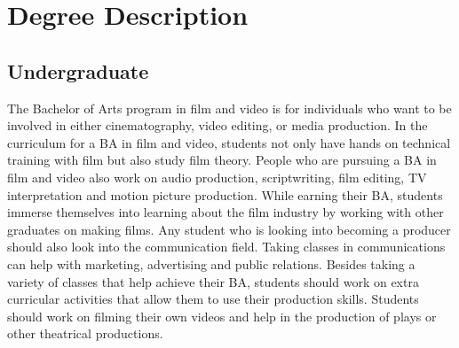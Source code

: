 \begin{itemize}
\end{itemize}

\section{Degree Description}
    \subsection{Undergraduate}
		The Bachelor of Arts program in film and video is for individuals who want to be involved in either cinematography, video editing, or media production. In the curriculum for a BA in film and video, students not only have hands on technical training with film but also study film theory. People who are pursuing a BA in film and video also work on audio production, scriptwriting, film editing, TV interpretation and motion picture production. While earning their BA, students immerse themselves into learning about the film industry by working with other graduates on making films. Any student who is looking into becoming a producer should also look into the communication field. Taking classes in communications can help with marketing, advertising and public relations. Besides taking a variety of classes that help achieve their BA, students should work on extra curricular activities that allow them to use their production skills. Students should work on filming their own videos and help in the production of plays or other theatrical productions.
